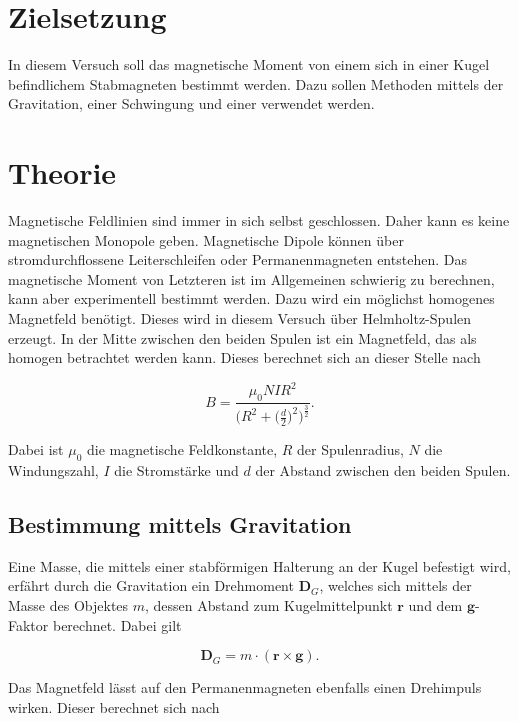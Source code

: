 \section{Zielsetzung}
In diesem Versuch soll das magnetische Moment von einem sich in einer Kugel befindlichem Stabmagneten bestimmt werden.
Dazu sollen Methoden mittels der Gravitation, einer Schwingung und einer verwendet werden.

\section{Theorie}
\label{sec:Theorie}

Magnetische Feldlinien sind immer in sich selbst geschlossen. Daher kann es keine magnetischen Monopole geben.
Magnetische Dipole können über stromdurchflossene Leiterschleifen oder Permanenmagneten entstehen. Das magnetische Moment von Letzteren ist im Allgemeinen schwierig zu berechnen, kann aber experimentell bestimmt werden.
Dazu wird ein möglichst homogenes Magnetfeld benötigt. Dieses wird in diesem Versuch über Helmholtz-Spulen erzeugt.
In der Mitte zwischen den beiden Spulen ist ein Magnetfeld, das als homogen betrachtet werden kann. 
Dieses berechnet sich an dieser Stelle nach

\begin{equation}
    \label{eqn:helmholtz}
    B = \frac{\mu_0 N I R^2}{\big(R^2 + \Big( \frac{d}{2} \Big)^2 \Big)^{\frac{3}{2}}}.
\end{equation}

Dabei ist $\mu_0$ die magnetische Feldkonstante, $R$ der Spulenradius, $N$ die Windungszahl, $I$ die Stromstärke und $d$ der Abstand zwischen den beiden Spulen.


\subsection{Bestimmung mittels Gravitation}

Eine Masse, die mittels einer stabförmigen Halterung an der Kugel befestigt wird, erfährt durch die Gravitation ein Drehmoment $\mathbf{D}_G$, welches sich mittels der Masse des Objektes $m$, dessen Abstand zum Kugelmittelpunkt $\mathbf{r}$ und dem $\mathbf{g}$-Faktor berechnet. Dabei gilt

\begin{equation}
    \label{eqn:dreh-grav}
    \mathbf{D}_G = m \cdot (\mathbf{r} \times \mathbf{g}).
\end{equation}

Das Magnetfeld lässt auf den Permanenmagneten ebenfalls einen Drehimpuls wirken. Dieser berechnet sich nach

